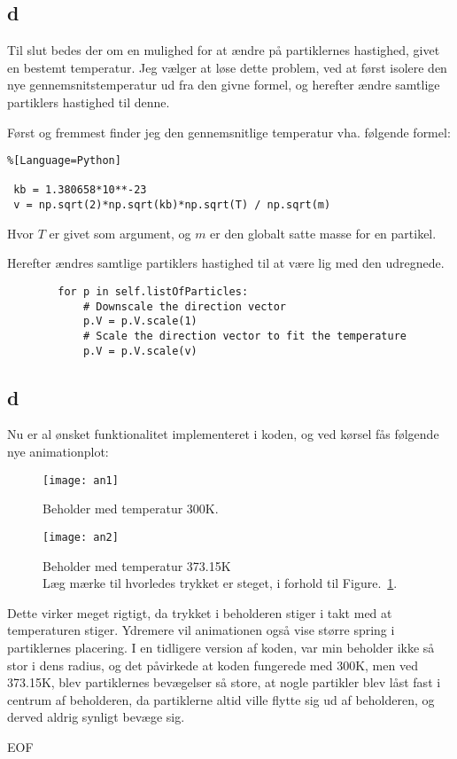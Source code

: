 \documentclass[11pt]{article} %
\begin{document}
\subsection*{d}
Til slut bedes der om en mulighed for at ændre på partiklernes hastighed, givet en bestemt temperatur. Jeg vælger at løse dette problem, ved at først isolere den nye gennemsnitstemperatur ud fra den givne formel, og herefter ændre samtlige partiklers hastighed til denne.

Først og fremmest finder jeg den gennemsnitlige temperatur vha. følgende formel:
\begin{lstlisting}%[Language=Python]

 kb = 1.380658*10**-23
 v = np.sqrt(2)*np.sqrt(kb)*np.sqrt(T) / np.sqrt(m)
\end{lstlisting}
Hvor $T$ er givet som argument, og $m$ er den globalt satte masse for en partikel.

Herefter ændres samtlige partiklers hastighed til at være lig med den udregnede.

\begin{lstlisting}
        for p in self.listOfParticles:
            # Downscale the direction vector
            p.V = p.V.scale(1)
            # Scale the direction vector to fit the temperature
            p.V = p.V.scale(v)
\end{lstlisting}

\newpage
\subsection*{d}
Nu er al ønsket funktionalitet implementeret i koden, og ved kørsel fås følgende nye animationplot:

\begin{figure}[h!]
\centering
   \texttt{[image: an1]}
  \caption{Beholder med temperatur 300K.}
	\label{plot2}
\end{figure}

\begin{figure}[h!]
\centering
   \texttt{[image: an2]}
  \caption{Beholder med temperatur 373.15K\\
  Læg mærke til hvorledes trykket er steget, i forhold til Figure.~\ref{plot2}.}
	\label{plot3}
\end{figure}

Dette virker meget rigtigt, da trykket i beholderen stiger i takt med at temperaturen stiger. Ydremere vil animationen også vise større spring i partiklernes placering.
I en tidligere version af koden, var min beholder ikke så stor i dens radius, og det påvirkede at koden fungerede med 300K, men ved 373.15K, blev partiklernes bevægelser så store, at nogle partikler blev låst fast i centrum af beholderen, da partiklerne altid ville flytte sig ud af beholderen, og derved aldrig synligt bevæge sig.

\begin{flushright}
EOF
\end{flushright}
\end{document}
